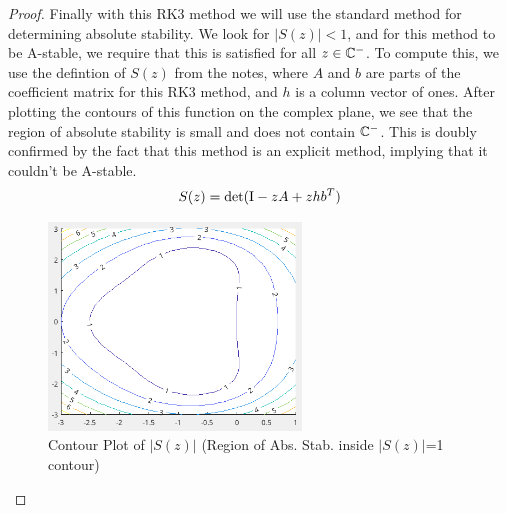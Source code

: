 \documentclass{article}
\begin{document}
\begin{enumerate}[label=\alph*)]
 \begin{proof}
    Finally with this RK3 method we will use the standard method for determining
    absolute stability. We look for $|S(z)| < 1$, and for this method to be
    A-stable, we require that this is satisfied for all $z \in \mathbb{C}^-$. To compute
    this, we use the defintion of $S(z)$ from the notes, where $A$ and $b$ are
    parts of the coefficient matrix for this RK3 method, and $h$ is a column
    vector of ones. After plotting the contours of this function on the complex
    plane, we see that the region of absolute stability is small and does not
    contain $\mathbb{C}^-$. This is doubly confirmed by the fact that this method is an
    explicit method, implying that it couldn't be A-stable. 
    \begin{align}
        S(z) = \det(\mathrm{I} - zA + zhb^T)
    \end{align}
    \begin{figure}[h]
        \centering
        \includegraphics[width=0.6\textwidth]{4cAbsStab.png}
        \caption{Contour Plot of $|S(z)|$ (Region of Abs. Stab. inside
        $|S(z)|$=1 contour)}
    \end{figure}
   
 \end{proof}


\end{enumerate}
\end{document}
